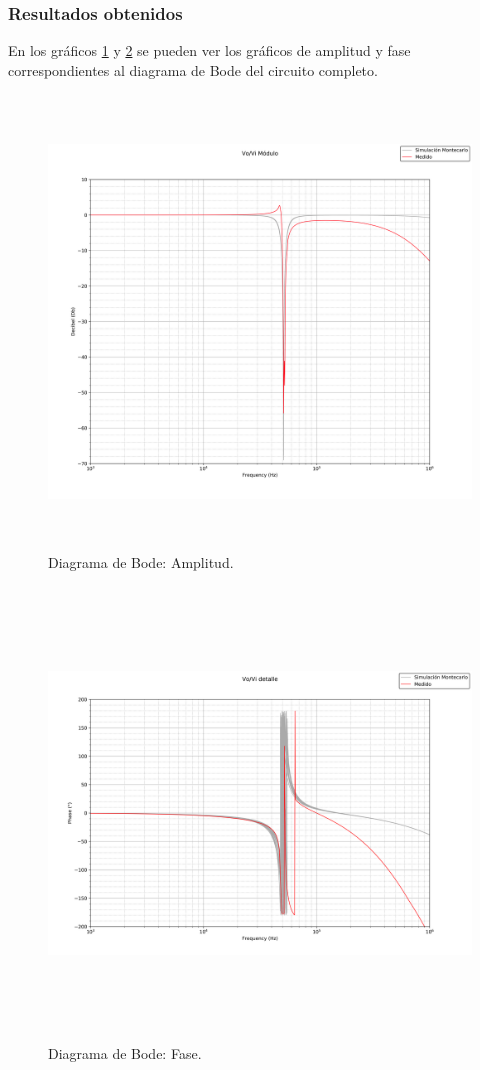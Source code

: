 \subsubsection{Resultados obtenidos}

 En los gr\'aficos \ref{bode_mod} y  \ref{bode_ph} se pueden ver los gr\'aficos de amplitud y fase correspondientes al diagrama de Bode del circuito completo.

 \begin{figure}[H] %
	\centering	\includegraphics[width=12cm,height=12cm,keepaspectratio]{../EJ4/graficos/BODE_BIEN.png}
	\caption{Diagrama de Bode: Amplitud.}
	\label{bode_mod}
\end{figure}


 \begin{figure}[H] %
	\centering	\includegraphics[width=12cm,height=12cm,keepaspectratio]{../EJ4/graficos/phase_bode.png}
	\caption{Diagrama de Bode: Fase.}
	\label{bode_ph}
\end{figure}


